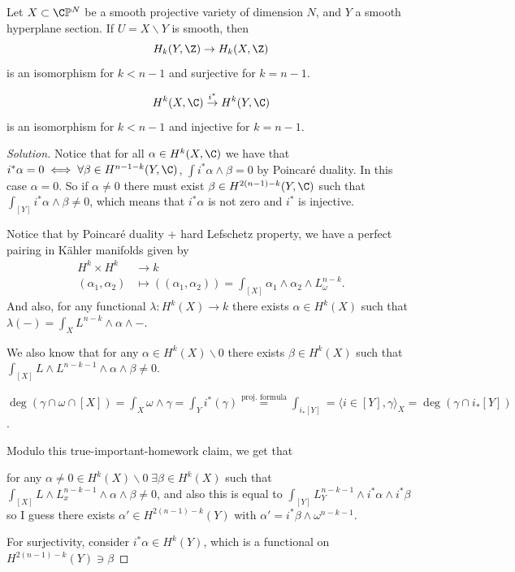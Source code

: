 \begin{exercise}
	Let $X\subset \C\mathbb{P}^N$ be a smooth projective variety of dimension $N$, and $Y$ a smooth hyperplane section. If $U=X\backslash Y$ is smooth, then
	\[H_k(Y,\Z)\to H_k(X,\Z)\]
	is an isomorphism for $k<n-1$ and surjective for $k=n-1$.
\end{exercise}
\begin{exercise}
	\[H^k(X,\C)\overset{i^*}{\to}H^k(Y,\C)\]
	is an isomorphism for $k<n-1$ and injective for  $k=n-1$.
\end{exercise}
\begin{proof}[Solution]
	Notice that for all $\alpha\in H^k(X,\C)$ we have that $i^*\alpha=0\iff\forall\beta\in H^{n-1-k}(Y,\C)$, $\int i^*\alpha\wedge\beta=0$ by Poincar\'e duality. In this case $\alpha=0$. So if  $\alpha\neq 0$ there must exist $\beta\in H^{2(n-1)-k}(Y,\C)$ such that $\int_{[Y]}i^*\alpha\wedge\beta\neq 0$, which means that $i^*\alpha$ is not zero and $i^*$ is injective.

	Notice that by Poincar\'e duality + hard Lefschetz property, we have a perfect pairing in K\"ahler manifolds given by
	\begin{align*}
		 H^k\times H^k &\longrightarrow k \\
		 (\alpha_1,\alpha_2) &\longmapsto ( (\alpha_1,\alpha_2)) = \int_{[X]}\alpha_1\wedge\alpha_2\wedge L^{n-k}_\omega
	.\end{align*}
	And also, for any functional $\lambda:H^k(X)\to k$ there exists $\alpha\in H^k(X)$ such that $\lambda(-)=\int_XL^{n-k}\wedge\alpha\wedge-$.

	We also know that for any $\alpha\in H^k(X)\backslash 0$ there exists $\beta\in H^k(X)$ such that $\int_{[X]}L\wedge L^{n-k-1}\wedge\alpha\wedge\beta\neq 0$.
	\begin{claim}
		$\deg(\gamma\cap\omega\cap[X])=\int_X\omega\wedge\gamma=\int_Yi^*(\gamma)\overset{\text{proj. formula}}{=}\int_{i_*[Y]}=\langle i\in[Y],\gamma\rangle_X=\deg(\gamma\cap i_*[Y])$.	
	\end{claim}

Modulo this true-important-homework claim, we get that

for any $\alpha\neq 0\in H^k(X)\backslash 0\;\exists \beta\in H^k(X)$ such that $\int_{[X]}L\wedge L_x^{n-k-1}\wedge\alpha\wedge\beta\neq 0$, and also this is equal to $\int_{[Y]}L_Y^{n-k-1}\wedge i^*\alpha\wedge i^*\beta$ so I guess there exists $\alpha'\in H^{2(n-1)-k}(Y)$ with $\alpha'=i^*\beta\wedge\omega^{n-k-1}$.

For surjectivity, consider $i^*\alpha\in H^k(Y)$, which is a functional on $H^{2(n-1)-k}(Y)\ni\beta$
\end{proof}

